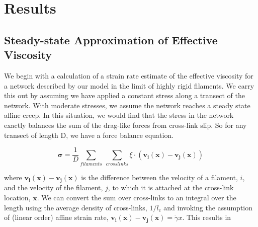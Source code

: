 












































\section{Results}

\subsection{Steady-state Approximation of Effective Viscosity}
\label{sec:eff_vic}
We begin with a calculation of a strain rate estimate of the effective viscosity for a network described by our model in the limit of highly rigid filaments.  We carry this out by assuming we have applied a constant stress along a transect of the network.  With moderate stresses, we assume the network reaches a steady state affine creep. In this situation, we would find that the stress in the network exactly balances the sum of the drag-like forces from cross-link slip.  So for any transect of length D, we have a force balance equation.

\begin{equation}
\mathbf{\sigma} = \frac{1}{D}\sum_{filaments}\: \sum_{crosslinks}\xi \cdot (\mathbf{v_i(x)}-\mathbf{v_j(x)})
\end{equation}

where $\mathbf{v_i(x)}-\mathbf{v_j(x)}$ is the difference between the velocity of a filament, $i$, and the velocity of the filament, $j$, to which it is attached at the cross-link location, $\mathbf{x}$. We can convert the sum over cross-links to an integral over the length using the average density of cross-links, $1/l_c$ and invoking the assumption of (linear order) affine strain rate, $\mathbf{v_i(x)}-\mathbf{v_j(x)}=\dot \gamma x$. This results in

